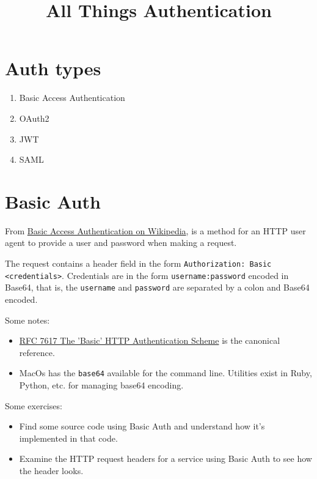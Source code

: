 \documentclass{article}
\title{All Things Authentication}
\begin{document}
\maketitle

\section{Auth types}


\begin{enumerate}
  \item Basic Access Authentication
  \item OAuth2
  \item JWT
  \item SAML
\end{enumerate}

\section{Basic Auth}

From \href{https://en.wikipedia.org/wiki/Basic_access_authentication}{%
  Basic Access Authentication on Wikipedia}, is a method for an HTTP
user agent to provide a user and password when making a request.

The request contains a header field in the form \texttt{Authorization: Basic
 <credentials>}. Credentials are in the form \texttt{username:password} encoded in
Base64, that is, the \texttt{username} and \texttt{password} are separated by a colon
and Base64 encoded.

Some notes:
\begin{itemize}
  \item \href{https://tools.ietf.org/html/rfc7617}{%
      RFC 7617 The 'Basic' HTTP Authentication Scheme} is the
    canonical reference.
  \item MacOs has the \texttt{base64} available for the command line. Utilities
    exist in Ruby, Python, etc. for managing base64 encoding.
\end{itemize}

Some exercises:

\begin{itemize}
  \item Find some source code using Basic Auth and understand how
    it's implemented in that code.
  \item Examine the HTTP request headers for a service using Basic Auth
    to see how the header looks.
\end{itemize}
\end{document}
